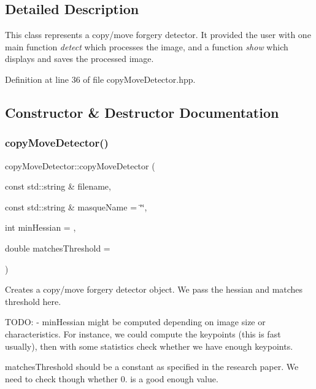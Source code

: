 \subsection{Detailed Description}
This class represents a copy/move forgery detector. It provided the user with one main function {\itshape detect} which processes the image, and a function {\itshape show} which displays and saves the processed image. 

Definition at line 36 of file copy\+Move\+Detector.\+hpp.



\subsection{Constructor \& Destructor Documentation}
\mbox{\label{classdefals_1_1copy_move_detector_acf2eb1bc6f3e65f3f638478441a58c8a}} 
\subsubsection{\texorpdfstring{copy\+Move\+Detector()}{copyMoveDetector()}}
{\footnotesize\ttfamily copy\+Move\+Detector\+::copy\+Move\+Detector (\begin{DoxyParamCaption}\item[{const std\+::string \&}]{filename,  }\item[{const std\+::string \&}]{masque\+Name = {\ttfamily \char`\"{}\char`\"{}},  }\item[{int}]{min\+Hessian = {},  }\item[{double}]{matches\+Threshold = {} }\end{DoxyParamCaption})}

Creates a copy/move forgery detector object. We pass the hessian and matches threshold here.

T\+O\+DO\+: -\/ min\+Hessian might be computed depending on image size or characteristics. For instance, we could compute the keypoints (this is fast usually), then with some statistics check whether we have enough keypoints.
\begin{DoxyItemize}
\item matches\+Threshold should be a constant as specified in the research paper. We need to check though whether 0. is a good enough value.
\end{DoxyItemize}


